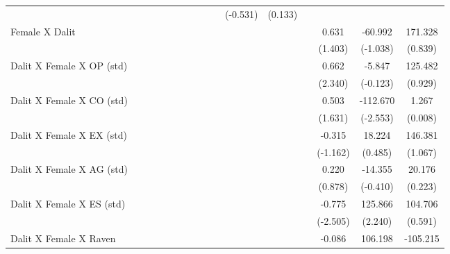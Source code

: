 {\begin{longtable}{@{\extracolsep{\fill}}lccccccccccccccc}
          &       &       &       &       &       &       &       &       &       & (-0.531) & (0.133) &       &       &       &  \\
    Female X Dalit &       &       &       &       &       &       &       &       &       &       &       &       & 0.631 & -60.992 & 171.328 \\
          &       &       &       &       &       &       &       &       &       &       &       &       & (1.403) & (-1.038) & (0.839) \\
    Dalit X Female X OP (std) &       &       &       &       &       &       &       &       &       &       &       &       & 0.662 & -5.847 & 125.482 \\
          &       &       &       &       &       &       &       &       &       &       &       &       & (2.340) & (-0.123) & (0.929) \\
    Dalit X Female X CO (std) &       &       &       &       &       &       &       &       &       &       &       &       & 0.503 & -112.670 & 1.267 \\
          &       &       &       &       &       &       &       &       &       &       &       &       & (1.631) & (-2.553) & (0.008) \\
    Dalit X Female X EX (std) &       &       &       &       &       &       &       &       &       &       &       &       & -0.315 & 18.224 & 146.381 \\
          &       &       &       &       &       &       &       &       &       &       &       &       & (-1.162) & (0.485) & (1.067) \\
    Dalit X Female X AG (std) &       &       &       &       &       &       &       &       &       &       &       &       & 0.220 & -14.355 & 20.176 \\
          &       &       &       &       &       &       &       &       &       &       &       &       & (0.878) & (-0.410) & (0.223) \\
    Dalit X Female X ES (std) &       &       &       &       &       &       &       &       &       &       &       &       & -0.775 & 125.866 & 104.706 \\
          &       &       &       &       &       &       &       &       &       &       &       &       & (-2.505) & (2.240) & (0.591) \\
    Dalit X Female X Raven &       &       &       &       &       &       &       &       &       &       &       &       & -0.086 & 106.198 & -105.215 \\

\end{longtable}}
